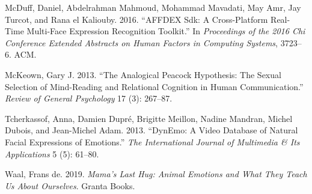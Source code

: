 \documentclass[conference,final,]{IEEEtran}
\begin{document}
\leavevmode\hypertarget{ref-mcduff2016affdex}{}%
McDuff, Daniel, Abdelrahman Mahmoud, Mohammad Mavadati, May Amr, Jay
Turcot, and Rana el Kaliouby. 2016. ``AFFDEX Sdk: A Cross-Platform
Real-Time Multi-Face Expression Recognition Toolkit.'' In
\emph{Proceedings of the 2016 Chi Conference Extended Abstracts on Human
Factors in Computing Systems}, 3723--6. ACM.

\leavevmode\hypertarget{ref-mckeown2013analogical}{}%
McKeown, Gary J. 2013. ``The Analogical Peacock Hypothesis: The Sexual
Selection of Mind-Reading and Relational Cognition in Human
Communication.'' \emph{Review of General Psychology} 17 (3): 267--87.

\leavevmode\hypertarget{ref-tcherkassof2013dynemo}{}%
Tcherkassof, Anna, Damien Dupré, Brigitte Meillon, Nadine Mandran,
Michel Dubois, and Jean-Michel Adam. 2013. ``DynEmo: A Video Database of
Natural Facial Expressions of Emotions.'' \emph{The International
Journal of Multimedia \& Its Applications} 5 (5): 61--80.

\leavevmode\hypertarget{ref-de2019mama}{}%
Waal, Frans de. 2019. \emph{Mama's Last Hug: Animal Emotions and What
They Teach Us About Ourselves}. Granta Books.
\end{document}
